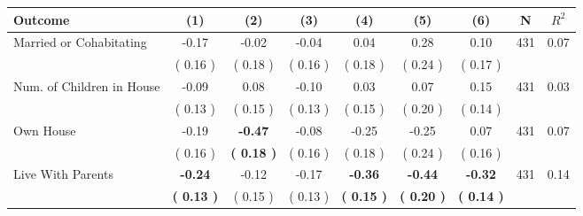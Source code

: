 \begin{tabular}{lcccccccc}
\toprule
 \textbf{Outcome} & \textbf{(1)} & \textbf{(2)} & \textbf{(3)} & \textbf{(4)} & \textbf{(5)} & \textbf{(6)} & \textbf{N} & \textbf{$ R^2$} \\
\midrule
Married or Cohabitating &     -0.17 &     -0.02 &     -0.04 &      0.04 &      0.28 &      0.10 & 431 &       0.07 \\ 
 & (     0.16 ) & (     0.18 ) & (     0.16 ) & (     0.18 ) & (     0.24 ) & (     0.17 ) & \\
Num. of Children in House &     -0.09 &      0.08 &     -0.10 &      0.03 &      0.07 &      0.15 & 431 &       0.03 \\ 
 & (     0.13 ) & (     0.15 ) & (     0.13 ) & (     0.15 ) & (     0.20 ) & (     0.14 ) & \\
Own House &     -0.19 & \textbf{    -0.47} &     -0.08 &     -0.25 &     -0.25 &      0.07 & 431 &       0.07 \\ 
 & (     0.16 ) & \textbf{(     0.18 )} & (     0.16 ) & (     0.18 ) & (     0.24 ) & (     0.16 ) & \\
Live With Parents & \textbf{    -0.24} &     -0.12 &     -0.17 & \textbf{    -0.36} & \textbf{    -0.44} & \textbf{    -0.32} & 431 &       0.14 \\ 
 & \textbf{(     0.13 )} & (     0.15 ) & (     0.13 ) & \textbf{(     0.15 )} & \textbf{(     0.20 )} & \textbf{(     0.14 )} & \\
\bottomrule
\end{tabular}
